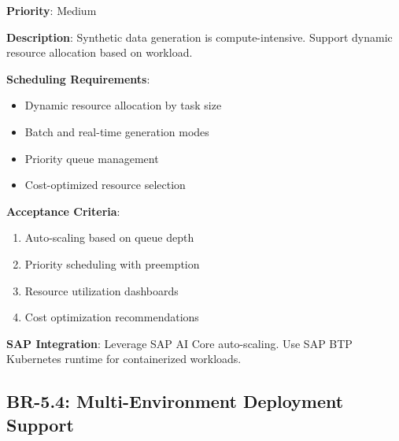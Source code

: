 \documentclass[12pt,a4paper,twoside]{report}
\begin{document}
\begin{tcolorbox}[colback=purple!5,colframe=purple!70,title=BR-5.3: Compute Resource Management]
\textbf{Priority}: Medium

\textbf{Description}: Synthetic data generation is compute-intensive. Support
dynamic resource allocation based on workload.

\textbf{Scheduling Requirements}:
\begin{itemize}
\item Dynamic resource allocation by task size
\item Batch and real-time generation modes
\item Priority queue management
\item Cost-optimized resource selection
\end{itemize}

\textbf{Acceptance Criteria}:
\begin{enumerate}
\item Auto-scaling based on queue depth
\item Priority scheduling with preemption
\item Resource utilization dashboards
\item Cost optimization recommendations
\end{enumerate}

\textbf{SAP Integration}: Leverage SAP AI Core auto-scaling. Use SAP BTP
Kubernetes runtime for containerized workloads.
\end{tcolorbox}

\subsection{BR-5.4: Multi-Environment Deployment Support}
\end{document}
